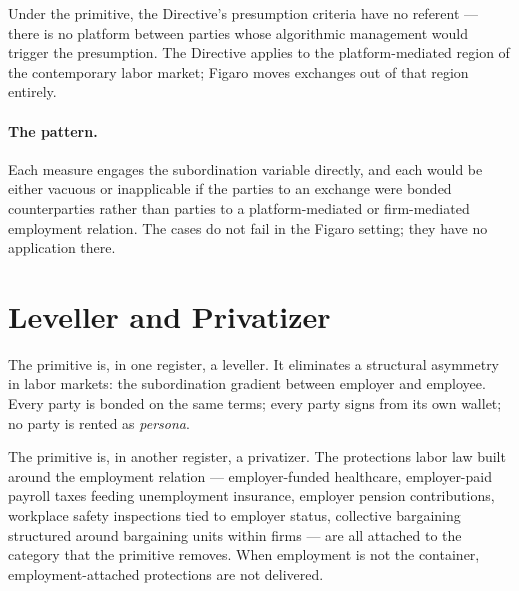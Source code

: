 \documentclass[11pt,a4paper]{article}
\theoremstyle{remark}
\begin{document}
Under the primitive, the Directive's presumption criteria have no
referent --- there is no platform between parties whose algorithmic
management would trigger the presumption. The Directive applies to
the platform-mediated region of the contemporary labor market;
Figaro moves exchanges out of that region entirely.

\paragraph{The pattern.}
Each measure engages the subordination variable directly, and each
would be either vacuous or inapplicable if the parties to an
exchange were bonded counterparties rather than parties to a
platform-mediated or firm-mediated employment relation. The cases
do not fail in the Figaro setting; they have no application there.

\section{Leveller and Privatizer}
\label{sec:leveller}

The primitive is, in one register, a leveller. It eliminates a
structural asymmetry in labor markets: the subordination gradient
between employer and employee. Every party is bonded on the same
terms; every party signs from its own wallet; no party is rented
as \emph{persona}.

The primitive is, in another register, a privatizer. The protections
labor law built around the employment relation --- employer-funded
healthcare, employer-paid payroll taxes feeding unemployment
insurance, employer pension contributions, workplace safety
inspections tied to employer status, collective bargaining
structured around bargaining units within firms --- are all
attached to the category that the primitive removes. When
employment is not the container, employment-attached protections
are not delivered.
\end{document}
